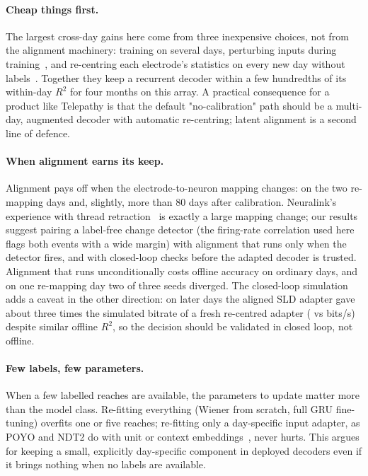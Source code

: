 \label{sec:discussion}
\paragraph{Cheap things first.} The largest cross-day gains here come from three
inexpensive choices, not from the alignment machinery: training on several days, perturbing
inputs during training~\cite{sussillo2016making}, and re-centring each electrode's statistics
on every new day without labels~\cite{jarosiewicz2015virtual}. Together they keep a recurrent
decoder within a few hundredths of its within-day $R^2$ for four months on this array. A
practical consequence for a product like Telepathy is that the default "no-calibration" path
should be a multi-day, augmented decoder with automatic re-centring; latent alignment is a
second line of defence.

\paragraph{When alignment earns its keep.} Alignment pays off when the electrode-to-neuron
mapping changes: on the two re-mapping days and, slightly, more than 80 days after
calibration. Neuralink's experience with thread retraction~\cite{neuralink2024prime} is
exactly a large mapping change; our results suggest pairing a label-free change detector
(the firing-rate correlation used here flags both events with a wide margin) with alignment
that runs only when the detector fires, and with closed-loop checks before the adapted decoder
is trusted. Alignment that runs unconditionally costs offline accuracy on ordinary days, and on one
re-mapping day two of three seeds diverged. The closed-loop simulation adds a caveat in the
other direction: on later days the aligned SLD adapter gave about three times the simulated
bitrate of a fresh re-centred adapter (\cdBpsSldAligned{} vs \cdBpsSldRc{} bits/s) despite
similar offline $R^2$, so the decision should be validated in closed loop, not offline.

\paragraph{Few labels, few parameters.} When a few labelled reaches are available, the
parameters to update matter more than the model class. Re-fitting everything (Wiener from
scratch, full GRU fine-tuning) overfits one or five reaches; re-fitting only a day-specific
input adapter, as POYO and NDT2 do with unit or context embeddings~\cite{azabou2023poyo,ye2023ndt2},
never hurts. This argues for keeping a small, explicitly day-specific component in deployed
decoders even if it brings nothing when no labels are available.

